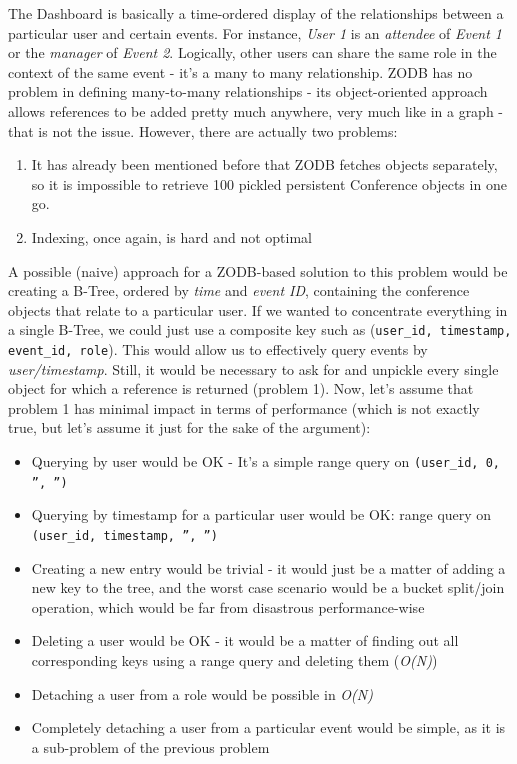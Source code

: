 The Dashboard is basically a time-ordered display of the relationships between a particular user and certain events. For instance, \textit{User 1} is an \textit{attendee} of \textit{Event 1} or the \textit{manager} of \textit{Event 2}. Logically, other users can share the same role in the context of the same event - it's a many to many relationship. \textsc{ZODB} has no problem in defining many-to-many relationships - its object-oriented approach allows references to be added pretty much anywhere, very much like in a graph - that is not the issue. However, there are actually two problems:

\begin{enumerate}
  \item It has already been mentioned before that \textsc{ZODB} fetches objects separately, so it is impossible to retrieve 100 pickled persistent Conference objects in one go.
  \item Indexing, once again, is hard and not optimal
\end{enumerate}

A possible (naive) approach for a \textsc{ZODB}-based solution to this problem would be creating a B-Tree, ordered by \textit{time} and \textit{event ID}, containing the conference objects that relate to a particular user. If we wanted to concentrate everything in a single B-Tree, we could just use a composite key such as (\texttt{user\_id, timestamp, event\_id, role}). This would allow us to effectively query events by \textit{user/timestamp}. Still, it would be necessary to ask for and unpickle every single object for which a reference is returned (problem 1). Now, let's assume that problem 1 has minimal impact in terms of performance (which is not exactly true, but let's assume it just for the sake of the argument):

\begin{itemize}
  \item Querying by user would be OK - It's a simple range query on \texttt{(user\_id, 0, '', '')}
  \item Querying by timestamp for a particular user would be OK: range query on \texttt{(user\_id, timestamp, '', '')}
  \item Creating a new entry would be trivial - it would just be a matter of adding a new key to the tree, and the worst case scenario would be a bucket split/join operation, which would be far from disastrous performance-wise
  \item Deleting a user would be OK - it would be a matter of finding out all corresponding keys using a range query and deleting them (\textit{O(N)})
  \item Detaching a user from a role would be possible in \textit{O(N)}
  \item Completely detaching a user from a particular event would be simple, as it is a sub-problem of the previous problem
\end{itemize}

